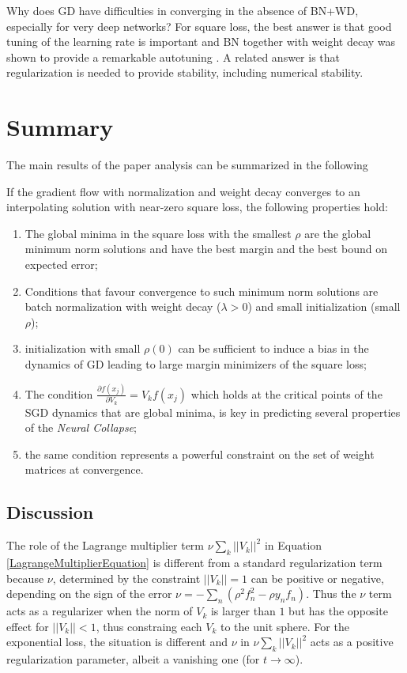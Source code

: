 \documentclass[11pt]{article}
\begin{document}
Why does GD have difficulties in converging in the absence of BN+WD,
especially for very deep networks? For square loss, the best answer is
that good tuning of the learning rate is important and BN together
with weight decay was shown to provide a remarkable autotuning
\cite{DBLP:journals/corr/abs-1812-03981}. A related answer is that
regularization is needed to provide stability, including numerical
stability.



\section{Summary}

The main results of the paper analysis can be summarized in the
following

\begin{lemma}
If the gradient flow with 
normalization  and weight decay converges to an
interpolating solution with near-zero square loss, the following
properties hold:

\begin{enumerate}
\item The global minima in the square loss with the smallest $\rho$
  are the global minimum norm
  solutions and have the best margin and the best bound on expected error;
\item Conditions that favour convergence to such minimum norm
  solutions are batch normalization with weight decay ($\lambda>0$)
  and small initialization (small $\rho$);
  \item initialization with small $\rho(0)$ can be sufficient to
    induce a bias in the dynamics of GD leading to large margin
    minimizers of the square loss;
\item The condition
  $\frac{\partial f(x_j)}{\partial V_k} = V_k f(x_j)$ which holds at
  the critical points of the SGD dynamics that are global minima, is key
  in predicting several properties of the {\it Neural
    Collapse\cite{Papyan24652}};
    \item the same condition represents a powerful constraint on the
      set of weight matrices at
      convergence.
\end{enumerate}
\end{lemma}

\subsection{Discussion}

  
  The role of the Lagrange multiplier term $\nu \sum_k
    ||V_k||^2 $ in Equation \ref{LagrangeMultiplierEquation} is
    different from a standard regularization term because $\nu$,
    determined by the constraint $||V_k||=1$ can be positive or
    negative, depending on the sign of the error $\nu=-
    \sum_n(\rho^2 f_n^2-\rho y_nf_n)$. Thus the $\nu$ term acts as
    a regularizer when the norm of $V_k$ is larger than $1$ but has
    the opposite effect for $||V_k|| <1$, thus constraing each $V_k$
    to the unit sphere. For the exponential loss, the situation is
    different and $\nu$ in  $\nu \sum_k
    ||V_k||^2 $ acts as a positive regularization parameter, albeit a
    vanishing one (for $t \to \infty$).
\end{document}
